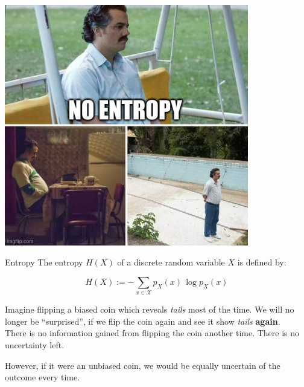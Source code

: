 \begin{frame}{\subsecname}
{\begin{minipage}{.99\textwidth}
\begin{minipage}{0.3\textwidth}
\begin{center}
	\end{center}
\end{minipage}
\hfill
\begin{minipage}{0.3\textwidth}
	\begin{center}
		\includegraphics[width=0.8\textwidth]{img/meme_entropy_none}
	\end{center}
	\end{minipage}
\end{minipage}
}

\end{frame}

\begin{frame}

\begin{block}{Entropy} 
The entropy $H(X)$ of a discrete random variable $X$ is defined by:

\begin{equation}
\label{eq:entropy}
H(X) := - \sum_{x \in \mathcal X} p_X(x)\,\log p_X(x)
\end{equation}

\end{block}

Imagine flipping a biased coin which reveals \textit{tails} most of the time. 
We will no longer be ``surprised'', if we flip the coin again and see it show \textit{tails} \textbf{again}.\\

There is no information gained from flipping the coin another time. There is no uncertainty left.

However, if it were an unbiased coin, we would be equally uncertain of the outcome every time.

\end{frame}

